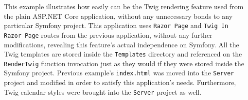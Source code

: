 This example illustrates how easily can be the Twig rendering feature used from the plain ASP.NET Core application, without any unnecessary bonds to any particular Symfony project. This application uses \texttt{Razor Page} and \texttt{Twig In Razor Page} routes from the previous application, without any further modifications, revealing this feature's actual independence on Symfony. All the Twig templates are stored inside the \texttt{Templates} directory and referenced on the \texttt{RenderTwig} function invocation just as they would if they were stored inside the Symfony project. Previous example's \texttt{index.html} was moved into the \texttt{Server} project and modified in order to satisfy this application's needs. Furthermore, Twig calendar styles were brought into the \texttt{Server} project as well. 

